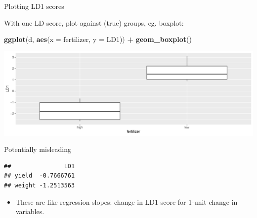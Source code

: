 \documentclass[
  ignorenonframetext,
]{beamer}
\newenvironment{Shaded}{\begin{snugshade}}{\end{snugshade}}
\newcommand{\DataTypeTok}[1]{\textcolor[rgb]{0.13,0.29,0.53}{#1}}
\newcommand{\FloatTok}[1]{\textcolor[rgb]{0.00,0.00,0.81}{#1}}
\newcommand{\KeywordTok}[1]{\textcolor[rgb]{0.13,0.29,0.53}{\textbf{#1}}}
\newcommand{\NormalTok}[1]{#1}
\newcommand{\OperatorTok}[1]{\textcolor[rgb]{0.81,0.36,0.00}{\textbf{#1}}}
\newcommand{\StringTok}[1]{\textcolor[rgb]{0.31,0.60,0.02}{#1}}
\providecommand{\tightlist}{%
  \setlength{\itemsep}{0pt}\setlength{\parskip}{0pt}}
\begin{document}
\begin{frame}[fragile]{Plotting LD1 scores}
\protect\hypertarget{plotting-ld1-scores}{}

With one LD score, plot against (true) groups, eg. boxplot:

\begin{Shaded}
\begin{Highlighting}[]
\KeywordTok{ggplot}\NormalTok{(d, }\KeywordTok{aes}\NormalTok{(}\DataTypeTok{x =}\NormalTok{ fertilizer, }\DataTypeTok{y =}\NormalTok{ LD1)) }\OperatorTok{+}\StringTok{ }\KeywordTok{geom_boxplot}\NormalTok{()}
\end{Highlighting}
\end{Shaded}

\includegraphics{slides_d29_files/figure-beamer/unnamed-chunk-305-1.pdf}

\end{frame}

\begin{frame}[fragile]{Potentially misleading}
\protect\hypertarget{potentially-misleading}{}

\begin{Shaded}
\end{Shaded}

\begin{verbatim}
##               LD1
## yield  -0.7666761
## weight -1.2513563
\end{verbatim}

\begin{itemize}
\tightlist
\item
  These are like regression slopes: change in LD1 score for 1-unit
  change in variables.
\end{itemize}

\end{frame}
\end{document}

